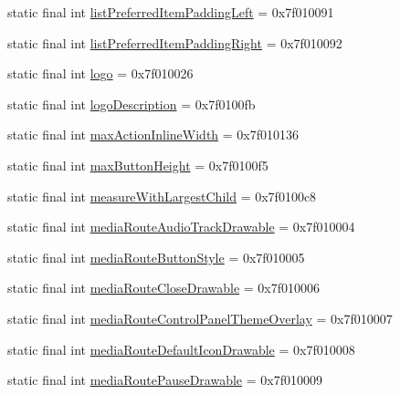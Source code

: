 \begin{CompactItemize}
\item 
static final int \hyperlink{classandroid_1_1support_1_1v7_1_1palette_1_1_r_1_1attr_f44796684701a4b4f9014185387257f9}{listPreferredItemPaddingLeft} = 0x7f010091
\item 
static final int \hyperlink{classandroid_1_1support_1_1v7_1_1palette_1_1_r_1_1attr_aa958a8ae582ba7b0ef7928b86c0144f}{listPreferredItemPaddingRight} = 0x7f010092
\item 
static final int \hyperlink{classandroid_1_1support_1_1v7_1_1palette_1_1_r_1_1attr_a8bd2f59c7567314fed38f5ac9e0a7fd}{logo} = 0x7f010026
\item 
static final int \hyperlink{classandroid_1_1support_1_1v7_1_1palette_1_1_r_1_1attr_c0bcde1cf7d2f3d0313501b56015dca6}{logoDescription} = 0x7f0100fb
\item 
static final int \hyperlink{classandroid_1_1support_1_1v7_1_1palette_1_1_r_1_1attr_5c2fc41aa46d79382f3e5bfd0300dbce}{maxActionInlineWidth} = 0x7f010136
\item 
static final int \hyperlink{classandroid_1_1support_1_1v7_1_1palette_1_1_r_1_1attr_73ea8feda294cbb726047c439325c8e6}{maxButtonHeight} = 0x7f0100f5
\item 
static final int \hyperlink{classandroid_1_1support_1_1v7_1_1palette_1_1_r_1_1attr_40691f8b28658d0a6ffb81cd70f87ead}{measureWithLargestChild} = 0x7f0100c8
\item 
static final int \hyperlink{classandroid_1_1support_1_1v7_1_1palette_1_1_r_1_1attr_bbca36058059900c01fbab873ab51af3}{mediaRouteAudioTrackDrawable} = 0x7f010004
\item 
static final int \hyperlink{classandroid_1_1support_1_1v7_1_1palette_1_1_r_1_1attr_3835d4c2d9aa8f8b5a77a940f3019ff4}{mediaRouteButtonStyle} = 0x7f010005
\item 
static final int \hyperlink{classandroid_1_1support_1_1v7_1_1palette_1_1_r_1_1attr_f3f60f4c7d6b82a9ef9a98a368e6a865}{mediaRouteCloseDrawable} = 0x7f010006
\item 
static final int \hyperlink{classandroid_1_1support_1_1v7_1_1palette_1_1_r_1_1attr_dc083431f48f67f5e434fee55598f2c0}{mediaRouteControlPanelThemeOverlay} = 0x7f010007
\item 
static final int \hyperlink{classandroid_1_1support_1_1v7_1_1palette_1_1_r_1_1attr_71c04ac2d2e20dff416f4100c34f3e7e}{mediaRouteDefaultIconDrawable} = 0x7f010008
\item 
static final int \hyperlink{classandroid_1_1support_1_1v7_1_1palette_1_1_r_1_1attr_19ff4187cdfe35899ecb361afdba4cef}{mediaRoutePauseDrawable} = 0x7f010009

\end{CompactItemize}
